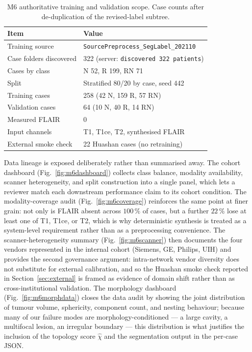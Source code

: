 \documentclass[11pt,a4paper]{article}
\begin{document}
\begin{table}[t]
\centering
\caption{M6 authoritative training and validation scope. Case counts after de-duplication of the revised-label subtree.}
\label{tab:m6cohort}
\small
\begin{tabular}{ll}
\toprule
Item & Value \\
\midrule
Training source & \texttt{SourcePreprocess\_SegLabel\_202110} \\
Case folders discovered & 322 (server: \texttt{discovered 322 patients}) \\
Cases by class & N 52, R 199, RN 71 \\
Split & Stratified 80/20 by case, seed 442 \\
Training cases & 258 (42 N, 159 R, 57 RN) \\
Validation cases & 64 (10 N, 40 R, 14 RN) \\
Measured FLAIR & 0 \\
Input channels & T1, T1ce, T2, synthesised FLAIR \\
External smoke check & 22 Huashan cases (no retraining) \\
\bottomrule
\end{tabular}
\end{table}

Data lineage is exposed deliberately rather than summarised away. The cohort dashboard (Fig.~\ref{fig:m6dashboard}) collects class balance, modality availability, scanner heterogeneity, and split construction into a single panel, which lets a reviewer match each downstream performance claim to its cohort condition. The modality-coverage audit (Fig.~\ref{fig:m6coverage}) reinforces the same point at finer grain: not only is FLAIR absent across $100\,\%$ of cases, but a further $22\,\%$ lose at least one of T1, T1ce, or T2, which is why deterministic synthesis is treated as a system-level requirement rather than as a preprocessing convenience. The scanner-heterogeneity summary (Fig.~\ref{fig:m6scanner}) then documents the four vendors represented in the internal cohort (Siemens, GE, Philips, UIH) and provides the second governance argument: intra-network vendor diversity does not substitute for external calibration, and so the Huashan smoke check reported in Section~\ref{sec:external} is framed as evidence of domain shift rather than as cross-institutional validation. The morphology dashboard (Fig.~\ref{fig:m6morphdata}) closes the data audit by showing the joint distribution of tumour volume, sphericity, component count, and nesting behaviour; because many of our failure modes are morphology-conditioned --- a large cavity, a multifocal lesion, an irregular boundary --- this distribution is what justifies the inclusion of the topology score $\hat{\chi}$ and the segmentation output in the per-case JSON.
\end{document}
